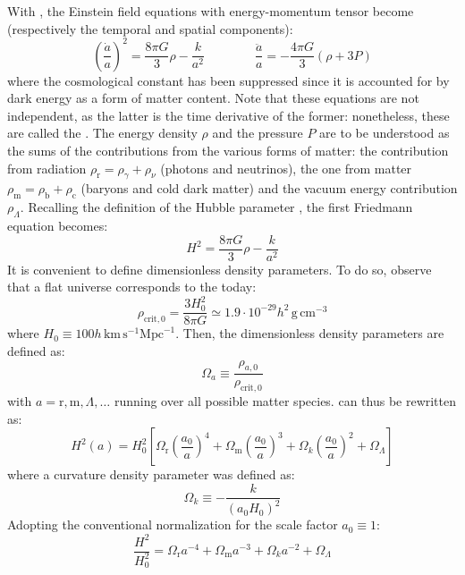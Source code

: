 With , the Einstein field equations  with energy-momentum tensor  become (respectively the temporal and spatial components):
\begin{equation}
  \left( \frac{\dot{a}}{a} \right)^2 = \frac{8\pi G}{3} \rho - \frac{k}{a^2}
  \qquad \qquad
  \frac{\ddot{a}}{a} = - \frac{4\pi G}{3} \left( \rho + 3 P \right)
\end{equation}
where the cosmological constant has been suppressed since it is accounted for by dark energy as a form of matter content. Note that these equations are not independent, as the latter is the time derivative of the former: nonetheless, these are called the . The energy density $ \rho $ and the pressure $ P $ are to be understood as the sums of the contributions from the various forms of matter: the contribution from radiation $ \rho_\text{r} = \rho_\gamma + \rho_\nu $ (photons and neutrinos), the one from matter $ \rho_\text{m} = \rho_\text{b} + \rho_\text{c} $ (baryons and cold dark matter) and the vacuum energy contribution $ \rho_\Lambda $. Recalling the definition of the Hubble parameter , the first Friedmann equation becomes:
\begin{equation}
  H^2 = \frac{8\pi G}{3} \rho - \frac{k}{a^2}
  \label{eq:fried-hubble}
\end{equation}
It is convenient to define dimensionless density parameters. To do so, observe that a flat universe corresponds to the  today:
\begin{equation*}
  \rho_{\text{crit},0} = \frac{3H_0^2}{8\pi G} \simeq 1.9 \cdot 10^{-29} h^2 \,\text{g} \, \text{cm}^{-3}
\end{equation*}
where $ H_0 \equiv 100 h \,\text{km} \,\text{s}^{-1} \text{Mpc}^{-1} $. Then, the dimensionless density parameters are defined as:
\begin{equation}
  \Omega_a \equiv \frac{\rho_{a,0}}{\rho_{\text{crit},0}}
  \label{eq:omega-def}
\end{equation}
with $ a = \text{r},\text{m},\Lambda,\dots $ running over all possible matter species.  can thus be rewritten as:
\begin{equation}
  H^2(a) = H_0^2 \left[ \Omega_\text{r} \left( \frac{a_0}{a} \right)^4 + \Omega_\text{m} \left( \frac{a_0}{a} \right)^3 + \Omega_k \left( \frac{a_0}{a} \right)^2 + \Omega_\Lambda \right]
\end{equation}
where a curvature density parameter was defined as:
\begin{equation}
  \Omega_k \equiv - \frac{k}{\left( a_0 H_0 \right)^2}
\end{equation}
Adopting the conventional normalization for the scale factor $ a_0 \equiv 1 $:
\begin{equation}
  \frac{H^2}{H_0^2} = \Omega_\text{r} a^{-4} + \Omega_\text{m} a^{-3} + \Omega_k a^{-2} + \Omega_\Lambda
  \label{eq:h-omega}
\end{equation}

